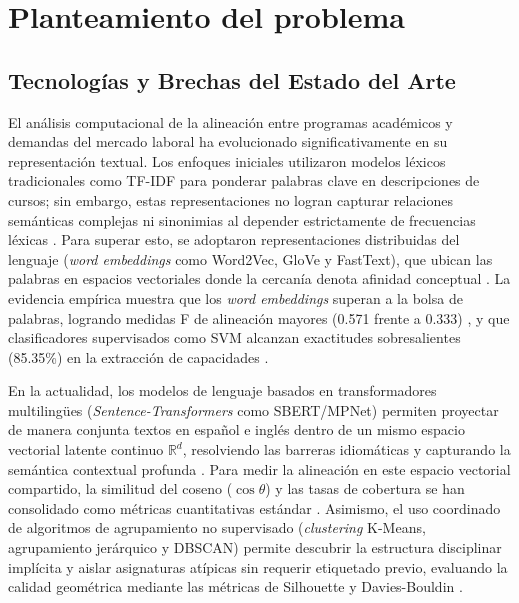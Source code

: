 \section{Planteamiento del problema}
\label{cap:problemStatement}

\subsection{Tecnologías y Brechas del Estado del Arte}
\label{sec:literature_gap}

El análisis computacional de la alineación entre programas académicos y demandas del mercado laboral ha evolucionado significativamente en su representación textual. Los enfoques iniciales utilizaron modelos léxicos tradicionales como TF-IDF para ponderar palabras clave en descripciones de cursos; sin embargo, estas representaciones no logran capturar relaciones semánticas complejas ni sinonimias al depender estrictamente de frecuencias léxicas \citep{naseem_comprehensive_2021}. Para superar esto, se adoptaron representaciones distribuidas del lenguaje (\textit{word embeddings} como Word2Vec, GloVe y FastText), que ubican las palabras en espacios vectoriales donde la cercanía denota afinidad conceptual \citep{naseem_comprehensive_2021}. La evidencia empírica muestra que los \textit{word embeddings} superan a la bolsa de palabras, logrando medidas F de alineación mayores (0.571 frente a 0.333) \citep{miura_automated_2021}, y que clasificadores supervisados como SVM alcanzan exactitudes sobresalientes (85.35\%) en la extracción de capacidades \citep{fan_identifying_2023}.

En la actualidad, los modelos de lenguaje basados en transformadores multilingües (\textit{Sentence-Transformers} como SBERT/MPNet) permiten proyectar de manera conjunta textos en español e inglés dentro de un mismo espacio vectorial latente continuo $\mathbb{R}^d$, resolviendo las barreras idiomáticas y capturando la semántica contextual profunda \citep{cristea_course_2025}. Para medir la alineación en este espacio vectorial compartido, la similitud del coseno ($\cos \theta$) y las tasas de cobertura se han consolidado como métricas cuantitativas estándar \citep{miura_automated_2021}. Asimismo, el uso coordinado de algoritmos de agrupamiento no supervisado (\textit{clustering} K-Means, agrupamiento jerárquico y DBSCAN) permite descubrir la estructura disciplinar implícita y aislar asignaturas atípicas sin requerir etiquetado previo, evaluando la calidad geométrica mediante las métricas de Silhouette y Davies-Bouldin \citep{remadi_prompt_2024,fan_identifying_2023}.

